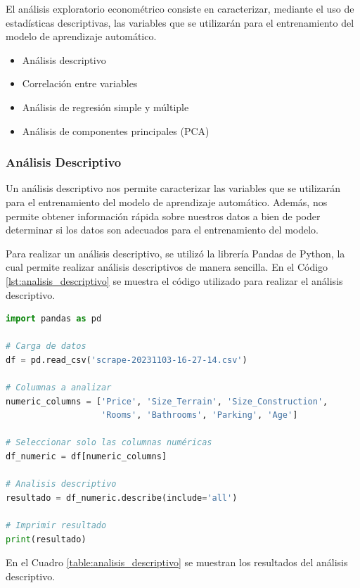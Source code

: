 El análisis exploratorio econométrico consiste en caracterizar, mediante el uso
de estadísticas descriptivas, las variables que se utilizarán para el
entrenamiento del modelo de aprendizaje automático.

\begin{itemize}
  \item Análisis descriptivo
  \item Correlación entre variables
  \item Análisis de regresión simple y múltiple
  \item Análisis de componentes principales (PCA)
\end{itemize}

\subsubsection{Análisis Descriptivo}

Un análisis descriptivo nos permite caracterizar las variables que se utilizarán
para el entrenamiento del modelo de aprendizaje automático. Además, nos permite
obtener información rápida sobre nuestros datos a bien de poder determinar si
los datos son adecuados para el entrenamiento del modelo.

Para realizar un análisis descriptivo, se utilizó la librería Pandas de Python,
la cual permite realizar análisis descriptivos de manera sencilla. En el Código
\ref{lst:analisis_descriptivo} se muestra el código utilizado para realizar el
análisis descriptivo.

\begin{lstlisting}[language=Python, label=lst:analisis_descriptivo, caption=Análisis descriptivo.]
import pandas as pd

# Carga de datos
df = pd.read_csv('scrape-20231103-16-27-14.csv')

# Columnas a analizar
numeric_columns = ['Price', 'Size_Terrain', 'Size_Construction',
                   'Rooms', 'Bathrooms', 'Parking', 'Age']

# Seleccionar solo las columnas numéricas
df_numeric = df[numeric_columns]

# Analisis descriptivo
resultado = df_numeric.describe(include='all')

# Imprimir resultado
print(resultado)
\end{lstlisting}

En el Cuadro \ref{table:analisis_descriptivo} se muestran los resultados del
análisis descriptivo.

